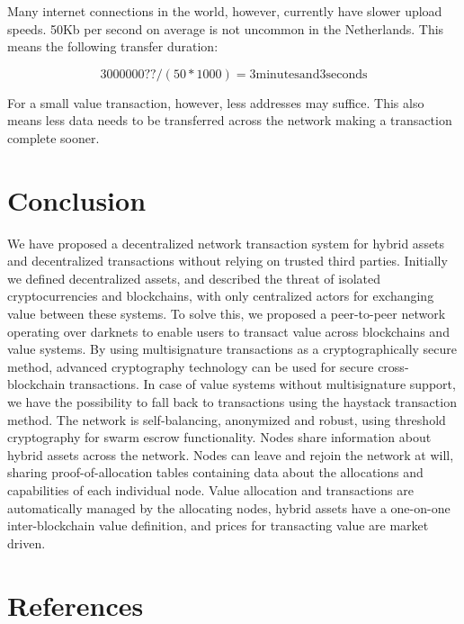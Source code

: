 \documentclass[a4paper]{article}
\begin{document}
Many internet connections in the world, however, currently have slower upload speeds. 50Kb per second on average is not uncommon in the Netherlands. This means the following transfer duration:

\begin{displaymath}
	3000000?? / (50*1000) = \mathrm{3 minutes and 3 seconds}
\end{displaymath}

For a small value transaction, however, less addresses may suffice. This also means less data needs to be transferred across the network making a transaction complete sooner.

\section{Conclusion}

We have proposed a decentralized network transaction system for hybrid assets and decentralized transactions without relying on trusted third parties. Initially we defined decentralized assets, and described the threat of isolated cryptocurrencies and blockchains, with only centralized actors for exchanging value between these systems. To solve this, we proposed a peer-to-peer network operating over darknets to enable users to transact value across blockchains and value systems. 
By using multisignature transactions as a cryptographically secure method, advanced cryptography technology can be used for secure cross-blockchain transactions. In case of value systems without multisignature support, we have the possibility to fall back to transactions using the haystack transaction method. The network is self-balancing, anonymized and robust, using threshold cryptography for swarm escrow functionality. Nodes share information about hybrid assets across the network. Nodes can leave and rejoin the network at will, sharing proof-of-allocation tables containing data about the allocations and capabilities of each individual node. Value allocation and transactions are automatically managed by the allocating nodes, hybrid assets have a one-on-one inter-blockchain value definition, and prices for transacting value are market driven.



\section{References}

{}

\end{document}
